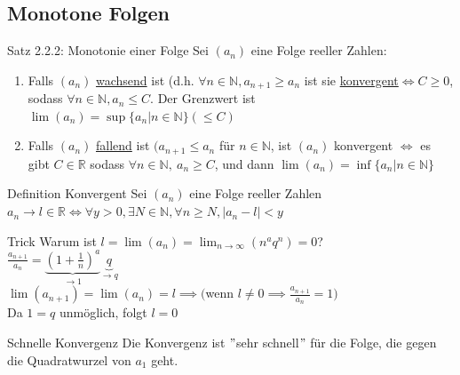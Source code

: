 \documentclass[a4paper,10pt]{article}
\begin{document}
\subsection{Monotone Folgen}
\begin{tbox}{Satz 2.2.2: Monotonie einer Folge}
    Sei $(a_n)$ eine Folge reeller Zahlen:
    \begin{enumerate}
        \item Falls $(a_n)$ \underline{wachsend} ist (d.h. $\forall n\in \mathbb N, a_{n+1}\ge a_n$ ist sie \underline{konvergent}$\iff C\ge 0 $, sodass $\forall n \in \mathbb N, a_n \le C$.
        Der Grenzwert ist $\lim(a_n) = \sup\{a_n|n\in\mathbb N \} (\le C)$
        \item Falls $(a_n)$ \underline{fallend} ist $(a_{n+1}\le a_n $ für $n\in \mathbb N $, ist $(a_n)$ konvergent $\iff$ es gibt $C\in \mathbb R$ sodass $\forall n \in \mathbb N,\ a_n\ge C$, und dann $ \lim(a_n)=\inf\{a_n|n\in \mathbb N\}$
    \end{enumerate}
\end{tbox}

\begin{defbox} {Definition Konvergent}
Sei $(a_n)$ eine Folge reeller Zahlen $a_n\longrightarrow l  \in \mathbb R \iff \forall y > 0, \exists N \in \mathbb N, \forall n \ge N, |a_n-l|<y$
\end{defbox}
\begin{tipbox}{Trick}
    Warum ist $l=\lim(a_n)=\lim_{n\to\infty}(n^a q^n)=0$?\\
    $\frac{a_{n+1}}{a_n}=\underbrace{(1+\frac{1}{n})^a}_{\to 1} \underbrace{q}_{\to q}$
    \\ $\lim(a_{n+1})=\lim(a_n)=l \implies ($wenn $ l\neq 0 \implies \frac{a_{n+1}}{a_n}=1) $
    \\ Da $1=q $ unmöglich, folgt $l=0$
\end{tipbox}
\begin{bembox}{Schnelle Konvergenz}
    Die Konvergenz ist $"$sehr schnell$"$ für die Folge, die gegen die Quadratwurzel von $a_1$ geht.
\end{bembox}
\end{document}
